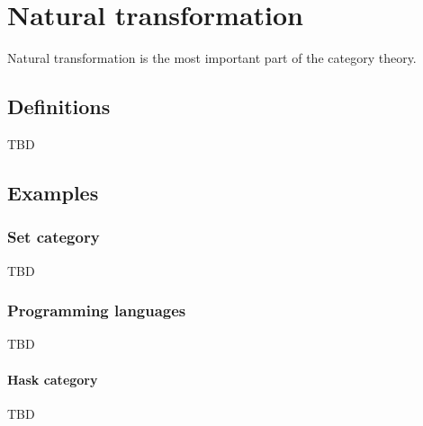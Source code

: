 \chapter{Natural transformation}

Natural transformation is the most important part of the category
theory. 

\section{Definitions}

TBD

\section{Examples}

\subsection{\textbf{Set} category}
TBD

\subsection{Programming languages}

\begin{theorem}[Reynolds]
\label{thm:reynolds}
TBD
\end{theorem}

\subsubsection{\textbf{Hask} category}
TBD
